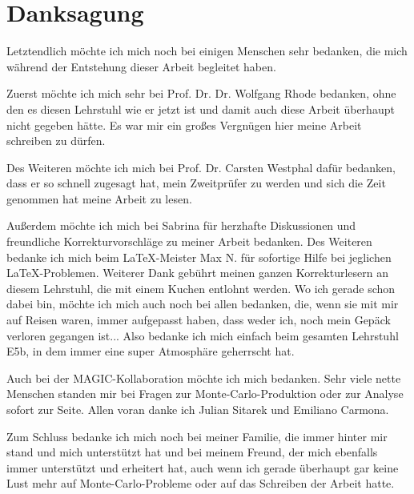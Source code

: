 \newpage
\thispagestyle{empty}
\section*{Danksagung}
Letztendlich möchte ich mich noch bei einigen Menschen sehr bedanken, die mich während der Entstehung dieser Arbeit begleitet haben.

Zuerst möchte ich mich sehr bei Prof. Dr. Dr. Wolfgang Rhode bedanken, ohne den es diesen Lehrstuhl wie er jetzt ist und damit auch diese Arbeit überhaupt nicht gegeben hätte.
Es war mir ein großes Vergnügen hier meine Arbeit schreiben zu dürfen.

Des Weiteren möchte ich mich bei Prof. Dr. Carsten Westphal dafür bedanken, dass er so schnell zugesagt hat, mein Zweitprüfer zu werden und sich die Zeit genommen hat meine Arbeit zu lesen.

Außerdem möchte ich mich bei Sabrina für herzhafte Diskussionen und freundliche Korrekturvorschläge zu meiner Arbeit bedanken.
Des Weiteren bedanke ich mich beim \LaTeX-Meister Max N. für sofortige Hilfe bei jeglichen \LaTeX-Problemen.
Weiterer Dank gebührt meinen ganzen Korrekturlesern an diesem Lehrstuhl, die mit einem Kuchen entlohnt werden.
Wo ich gerade schon dabei bin, möchte ich mich auch noch bei allen bedanken, die, wenn sie mit mir auf Reisen waren, immer aufgepasst haben, dass weder ich, noch mein Gepäck verloren gegangen ist...
Also bedanke ich mich einfach beim gesamten Lehrstuhl E5b, in dem immer eine super Atmosphäre geherrscht hat.

Auch bei der MAGIC-Kollaboration möchte ich mich bedanken. 
Sehr viele nette Menschen standen mir bei Fragen zur Monte-Carlo-Produktion oder zur Analyse sofort zur Seite.
Allen voran danke ich Julian Sitarek und Emiliano Carmona.

Zum Schluss bedanke ich mich noch bei meiner Familie, die immer hinter mir stand und mich unterstützt hat und bei meinem Freund, der mich ebenfalls immer unterstützt und erheitert hat, auch wenn ich gerade überhaupt gar keine Lust mehr auf Monte-Carlo-Probleme oder auf das Schreiben der Arbeit hatte.





